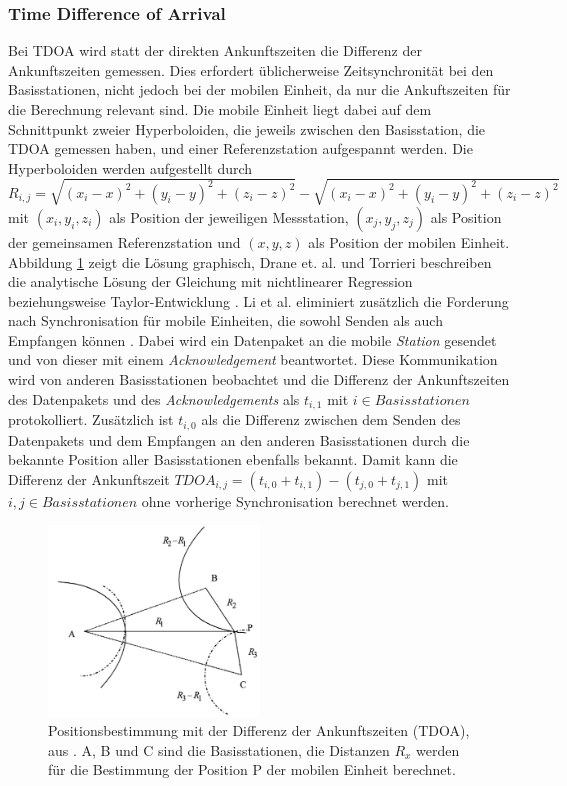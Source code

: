 \subsubsection{Time Difference of Arrival}
Bei TDOA wird statt der direkten Ankunftszeiten die Differenz der Ankunftszeiten gemessen. 
Dies erfordert üblicherweise Zeitsynchronität bei den Basisstationen, nicht jedoch bei der mobilen Einheit, da nur die Ankuftszeiten für die Berechnung relevant sind. 
Die mobile Einheit liegt dabei auf dem Schnittpunkt zweier Hyperboloiden, die jeweils zwischen den Basisstation, die TDOA gemessen haben, und einer Referenzstation aufgespannt werden. 
Die Hyperboloiden werden aufgestellt durch 
$R_{i,j} = \sqrt{(x_i - x)^2 + (y_i - y)^2 + (z_i - z)^2} - \sqrt{(x_i - x)^2 + (y_i - y)^2 + (z_i - z)^2}$ mit $(x_i,y_i,z_i)$ als Position der jeweiligen Messstation, $(x_j,y_j,z_j)$ als Position der gemeinsamen Referenzstation und $(x,y,z)$ als Position der mobilen Einheit. 
Abbildung \ref{fig:tdoa} zeigt die Lösung graphisch, Drane et. al. und Torrieri beschreiben die analytische Lösung der Gleichung mit nichtlinearer Regression \cite{drane1998positioning} beziehungsweise Taylor-Entwicklung \cite{torrieri1984statistical}. 
Li et al. eliminiert zusätzlich die Forderung nach Synchronisation für mobile Einheiten, die sowohl Senden als auch Empfangen können \cite{li2000comparison}. 
Dabei wird ein Datenpaket an die mobile \emph{Station} gesendet und von dieser mit einem \emph{Acknowledgement} beantwortet. 
Diese Kommunikation wird von anderen Basisstationen beobachtet und die Differenz der Ankunftszeiten des Datenpakets und des \emph{Acknowledgements} als $t_{i,1}$ mit $i \in Basisstationen$ protokolliert. 
Zusätzlich ist $t_{i,0}$ als die Differenz zwischen dem Senden des Datenpakets und dem Empfangen an den anderen Basisstationen durch die bekannte Position aller Basisstationen ebenfalls bekannt. 
Damit kann die Differenz der Ankunftszeit $TDOA_{i,j} = (t_{i,0} + t_{i,1}) - (t_{j,0} + t_{j,1})$ mit $i,j \in Basisstationen$ ohne vorherige Synchronisation berechnet werden. 

\begin{figure}[h]
  \centering
	\includegraphics[width=0.5\textwidth]{images/tdoa.png}
  \caption{Positionsbestimmung mit der Differenz der Ankunftszeiten (TDOA), aus \cite{liu2007survey}. A, B und C sind die Basisstationen, die Distanzen $R_x$ werden für die Bestimmung der Position P der mobilen Einheit berechnet.}
  \label{fig:tdoa}
\end{figure}

